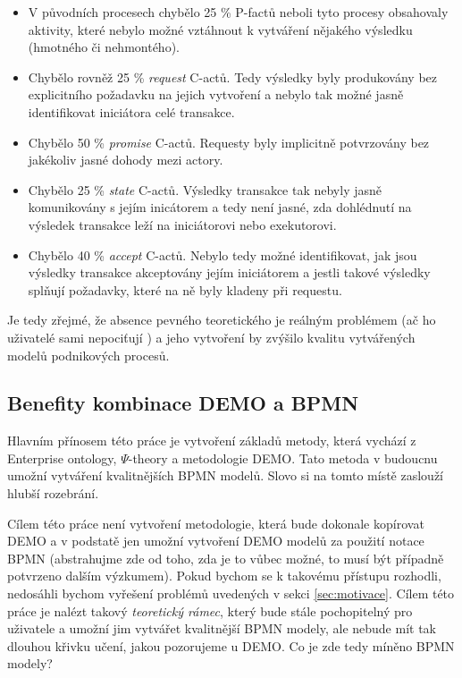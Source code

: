 \documentclass[]{article}
\newcommand{\ptheory}{$\Psi$-theory }
\begin{document}
\begin{itemize}
\item V původních procesech chybělo 25 \% P-factů neboli tyto procesy obsahovaly aktivity, které nebylo možné vztáhnout k vytváření nějakého výsledku (hmotného či nehmontého).
\item Chybělo rovněž 25 \% \textit{request} C-actů. Tedy výsledky byly produkovány bez explicitního požadavku na jejich vytvoření a nebylo tak možné jasně identifikovat iniciátora celé transakce.
\item Chybělo 50 \% \textit{promise} C-actů. Requesty byly implicitně potvrzovány bez jakékoliv jasné dohody mezi actory.
\item Chybělo 25 \% \textit{state} C-actů. Výsledky transakce tak nebyly jasně komunikovány s jejím inicátorem a tedy není jasné, zda dohlédnutí na výsledek transakce leží na iniciátorovi nebo exekutorovi.
\item Chybělo 40 \% \textit{accept} C-actů. Nebylo tedy možné identifikovat, jak jsou výsledky transakce akceptovány jejím iniciátorem a jestli takové výsledky splňují požadavky, které na ně byly kladeny při requestu.
\end{itemize}

Je tedy zřejmé, že absence pevného teoretického je reálným problémem (ač ho uživatelé sami nepociťují \cite{VanNuffel2009}) a jeho vytvoření by zvýšilo kvalitu vytvářených modelů podnikových procesů.

\subsection{Benefity kombinace DEMO a BPMN} \label{sec:demo_bpmn_benefity}
Hlavním přínosem této práce je vytvoření základů metody, která vychází z Enterprise ontology, \ptheory a metodologie DEMO. Tato metoda v budoucnu umožní vytváření kvalitnějších BPMN modelů. Slovo  si na tomto místě zaslouží hlubší rozebrání.

Cílem této práce není vytvoření metodologie, která bude dokonale kopírovat DEMO a v podstatě jen umožní vytvoření DEMO modelů za použití notace BPMN (abstrahujme zde od toho, zda je to vůbec možné, to musí být případně potvrzeno dalším výzkumem). Pokud bychom se k takovému přístupu rozhodli, nedosáhli bychom vyřešení problémů uvedených v sekci \ref{sec:motivace}. Cílem této práce je nalézt takový \textit{teoretický rámec}, který bude stále pochopitelný pro uživatele a umožní jim vytvářet kvalitnější BPMN modely, ale nebude mít tak dlouhou křivku učení, jakou pozorujeme u DEMO. Co je zde tedy míněno  BPMN modely?
\end{document}
